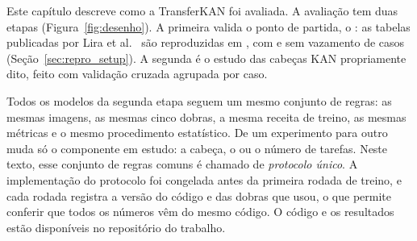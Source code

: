 \label{chap:methodology}

Este capítulo descreve como a TransferKAN foi avaliada. A avaliação tem duas etapas (Figura~\ref{fig:desenho}). A primeira valida o ponto de partida, o : as tabelas publicadas por Lira et al.~\cite{Lira2025deep} são reproduzidas em , com e sem vazamento de casos (Seção~\ref{sec:repro_setup}). A segunda é o estudo das cabeças KAN propriamente dito, feito com validação cruzada agrupada por caso.

Todos os modelos da segunda etapa seguem um mesmo conjunto de regras: as mesmas imagens, as mesmas cinco dobras, a mesma receita de treino, as mesmas métricas e o mesmo procedimento estatístico. De um experimento para outro muda só o componente em estudo: a cabeça, o  ou o número de tarefas. Neste texto, esse conjunto de regras comuns é chamado de \emph{protocolo único}. A implementação do protocolo foi congelada antes da primeira rodada de treino, e cada rodada registra a versão do código e das dobras que usou, o que permite conferir que todos os números vêm do mesmo código. O código e os resultados estão disponíveis no repositório do trabalho.

